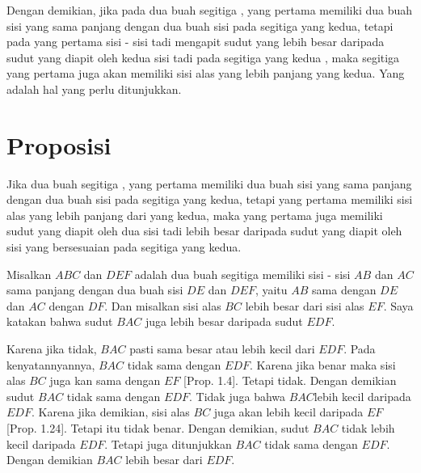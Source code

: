 \documentclass[a4paper]{book}
\begin{document}
Dengan demikian, jika pada dua buah segitiga , yang pertama memiliki 
dua buah sisi yang sama panjang  dengan dua buah sisi pada segitiga yang 
kedua, tetapi pada yang pertama sisi - sisi tadi mengapit sudut yang 
lebih besar daripada sudut yang diapit oleh kedua sisi tadi pada segitiga 
yang kedua , maka segitiga yang pertama juga akan memiliki sisi alas 
yang lebih panjang yang kedua. Yang adalah hal yang perlu ditunjukkan.

\section*{\centering Proposisi \thesection}
Jika dua buah segitiga , yang pertama memiliki dua buah sisi yang
sama panjang dengan dua buah sisi pada segitiga yang kedua, tetapi
yang pertama memiliki sisi alas yang lebih panjang dari yang kedua, 
maka yang pertama juga memiliki sudut yang diapit oleh dua sisi tadi
lebih besar daripada sudut yang diapit oleh sisi yang bersesuaian 
pada segitiga yang kedua.
\begin{center}
\end{center}

Misalkan $ABC$ dan $DEF$ adalah dua buah segitiga memiliki sisi - sisi
$AB$ dan $AC$ sama panjang dengan dua buah sisi $DE$ dan $DEF$, yaitu
$AB$ sama dengan $DE$ dan $AC$ dengan $DF$. Dan misalkan sisi alas $BC$
lebih besar dari sisi alas $EF$. Saya katakan bahwa sudut $BAC$ juga lebih
besar daripada sudut $EDF$.

Karena jika tidak, $BAC$ pasti sama besar atau lebih kecil dari $EDF$. Pada 
kenyatannyannya, $BAC$ tidak sama dengan $EDF$. Karena jika benar maka sisi
alas $BC$ juga kan sama dengan $EF$ [Prop. 1.4]. Tetapi tidak. Dengan demikian
sudut $BAC$ tidak sama dengan $EDF$. Tidak juga bahwa $BAC $lebih kecil 
daripada $EDF$. Karena jika demikian, sisi alas $BC$ juga akan lebih
kecil daripada $EF$ [Prop. 1.24]. Tetapi itu tidak benar. Dengan demikian, 
sudut $BAC$ tidak lebih kecil daripada $EDF$. Tetapi juga ditunjukkan $BAC$
tidak sama dengan $EDF$. Dengan demikian $BAC$ lebih besar dari $EDF$.
\end{document}

